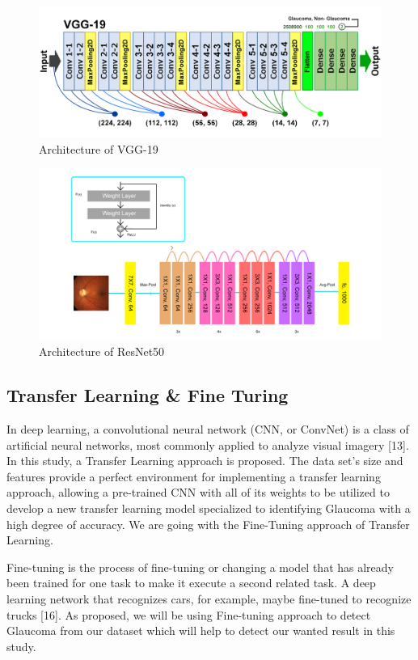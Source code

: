 \documentclass[conference]{IEEEtran}
\begin{document}
\begin{figure}[hbt!]
\centerline{\includegraphics[scale=0.4]{vgg19archireal.png}}
\caption{Architecture of VGG-19}
\label{fig}
\end{figure}


\begin{figure}[hbt!]
\centerline{\includegraphics[scale=0.3]{resnet50.png}}
\caption{Architecture of ResNet50}
\label{fig}
\end{figure}

\subsection{Transfer Learning \& Fine Turing}

In deep learning, a convolutional neural network (CNN, or ConvNet) is a class of artificial neural networks, most commonly applied to analyze visual imagery [13].
In this study, a Transfer Learning approach is proposed. The data set’s size and features provide a perfect environment for implementing a transfer learning approach, allowing a pre-trained CNN with all of its weights to be utilized to develop a new transfer learning model specialized to identifying Glaucoma with a high degree of accuracy. We are going with the Fine-Tuning approach of Transfer Learning.

\noindent Fine-tuning is the process of fine-tuning or changing a model that has already been trained for one task to make it execute a second related task. A deep learning network that recognizes cars, for example, maybe fine-tuned to recognize trucks [16]. As proposed, we will be using Fine-tuning approach to detect Glaucoma from our dataset which will help to detect our wanted result in this study.
\end{document}
